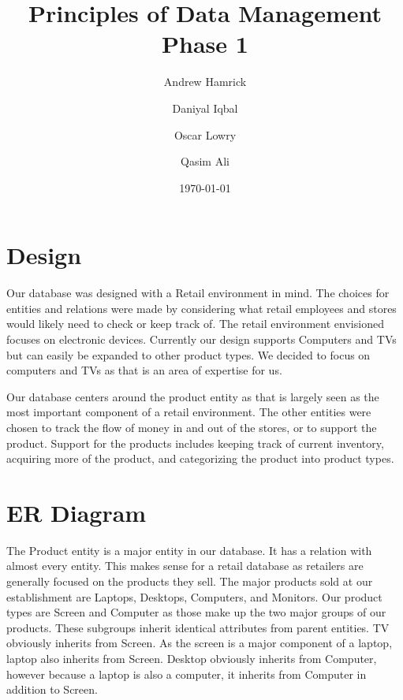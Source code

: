 \documentclass{article}
\title{Principles of Data Management\\\Large Phase 1}
\date{\today}
\author{
	Andrew Hamrick
	\and
	Daniyal Iqbal
	\and
	Oscar Lowry
	\and
	Qasim Ali
}
\begin{document}
	\maketitle
	\newpage

	\section{Design}
		Our database was designed with a Retail environment in mind. The choices for
		entities and relations were made by considering what retail employees and
		stores would likely need to check or keep track of. The retail environment
		envisioned focuses on electronic devices. Currently our design supports
		Computers and TVs but can easily be expanded to other product types. We
		decided to focus on computers and TVs as that is an area of expertise for
		us.\\
		\vspace{0pt}

		Our database centers around the product entity as that is largely seen as
		the most important component of a retail environment. The other entities
		were chosen to track the flow of money in and out of the stores, or to
		support the product. Support for the products includes keeping track of
		current inventory, acquiring more of the product, and categorizing the
		product into product types.

	\section{ER Diagram}
    The Product entity is a major entity in our database. It has a relation with
    almost every entity. This makes sense for a retail database as retailers are
    generally focused on the products they sell. The major products sold at our
    establishment are Laptops, Desktops, Computers, and Monitors. Our product
    types are Screen and Computer as those make up the two major groups of our
    products.  These subgroups inherit identical attributes from parent
    entities.  TV obviously inherits from Screen. As the screen is a major
    component of a laptop, laptop also inherits from Screen.  Desktop obviously
    inherits from Computer, however because a laptop is also a computer, it
    inherits from Computer in addition to Screen.
\end{document}

